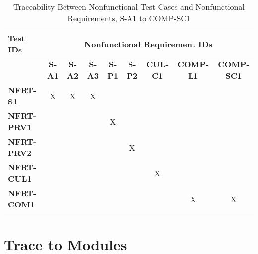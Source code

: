 \documentclass[12pt, titlepage]{article}
\begin{document}
\begin{landscape}
\begin{longtable}{|l|cccccccc|}
  \hline
  \textbf{Test IDs}  & \multicolumn{8}{c|}{\textbf{Nonfunctional Requirement IDs}} \\
  \hline
  ~                  & \textbf{S-A1} & \textbf{S-A2} & \textbf{S-A3} & \textbf{S-P1} & \textbf{S-P2} & \textbf{CUL-C1} & \textbf{COMP-L1} & \textbf{COMP-SC1} \\
  \hline
  \textbf{NFRT-S1}   & X             & X             & X             & ~             & ~             & ~               & ~                & ~                 \\
  \textbf{NFRT-PRV1} & ~             & ~             & ~             & X             & ~             & ~               & ~                & ~                 \\
  \textbf{NFRT-PRV2} & ~             & ~             & ~             & ~             & X             & ~               & ~                & ~                 \\
  \textbf{NFRT-CUL1} & ~             & ~             & ~             & ~             & ~             & X               & ~                & ~                 \\
  \textbf{NFRT-COM1} & ~             & ~             & ~             & ~             & ~             & ~               & X                & X                 \\
  \hline
\caption{Traceability Between Nonfunctional Test Cases and Nonfunctional Requirements, S-A1 to COMP-SC1} \\
\end{longtable}

\newpage
\end{landscape}
		
\section{Trace to Modules}		
\end{document}
